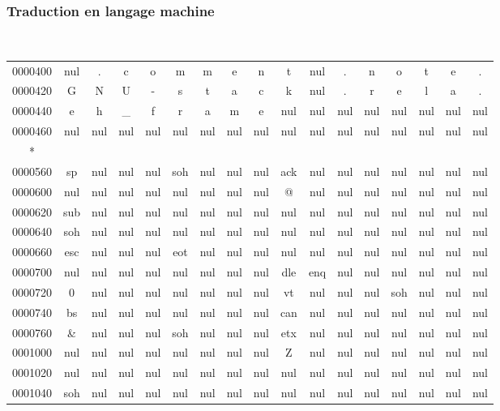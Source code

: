 \begin{frame}[fragile]
\frametitle{Traduction en langage machine}
{\tt \footnotesize
\setlength{\tabcolsep}{.07cm}
\begin{tabular}{ccccccccccccccccc}
0000400 &nul &. &c &o &m &m &e &n &t &nul &. &n &o &t &e &. \\
0000420 &G &N &U &- &s &t &a &c &k &nul &. &r &e &l &a &. \\
0000440 &e &h &\_ &f &r &a &m &e &nul &nul &nul &nul &nul &nul &nul &nul \\
0000460 &nul &nul &nul &nul &nul &nul &nul &nul &nul &nul &nul &nul &nul &nul &nul &nul \\
* \\
0000560 &sp &nul &nul &nul &soh &nul &nul &nul &ack &nul &nul &nul &nul &nul &nul &nul \\
0000600 &nul &nul &nul &nul &nul &nul &nul &nul &@ &nul &nul &nul &nul &nul &nul &nul \\
0000620 &sub &nul &nul &nul &nul &nul &nul &nul &nul &nul &nul &nul &nul &nul &nul &nul \\
0000640 &soh &nul &nul &nul &nul &nul &nul &nul &nul &nul &nul &nul &nul &nul &nul &nul \\
0000660 &esc &nul &nul &nul &eot &nul &nul &nul &nul &nul &nul &nul &nul &nul &nul &nul \\
0000700 &nul &nul &nul &nul &nul &nul &nul &nul &dle &enq &nul &nul &nul &nul &nul &nul \\
0000720 &0 &nul &nul &nul &nul &nul &nul &nul &vt &nul &nul &nul &soh &nul &nul &nul \\
0000740 &bs &nul &nul &nul &nul &nul &nul &nul &can &nul &nul &nul &nul &nul &nul &nul \\
0000760 &\& &nul &nul &nul &soh &nul &nul &nul &etx &nul &nul &nul &nul &nul &nul &nul \\
0001000 &nul &nul &nul &nul &nul &nul &nul &nul &Z &nul &nul &nul &nul &nul &nul &nul \\
0001020 &nul &nul &nul &nul &nul &nul &nul &nul &nul &nul &nul &nul &nul &nul &nul &nul \\
0001040 &soh &nul &nul &nul &nul &nul &nul &nul &nul &nul &nul &nul &nul &nul &nul &nul \\
\end{tabular}}
\end{frame}

